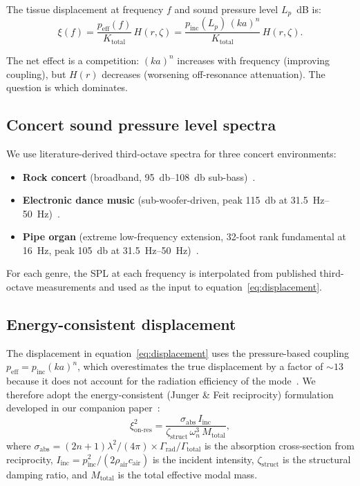 The tissue displacement at frequency $f$ and sound pressure level
$L_p$~dB is:
%
\begin{equation}
  \xi(f) = \frac{p_\mathrm{eff}(f)}{K_\mathrm{total}} \, H(r, \zeta)
  = \frac{p_\mathrm{inc}(L_p)\,(ka)^n}{K_\mathrm{total}} \, H(r, \zeta).
  \label{eq:displacement}
\end{equation}

The net effect is a competition: $(ka)^n$ increases with frequency
(improving coupling), but $H(r)$ decreases (worsening off-resonance
attenuation).  The question is which dominates.

\subsection{Concert sound pressure level spectra}
\label{sec:concert-spl}

We use literature-derived third-octave spectra for three concert
environments:
%
\begin{itemize}
  \item \textbf{Rock concert} (broadband, \SIrange{95}{108}{\decibel}
    sub-bass)~\cite{Gunderson2016}.
  \item \textbf{Electronic dance music} (sub-woofer-driven, peak
    \SI{115}{\decibel} at \SIrange{31.5}{50}{\hertz})~\cite{Opperman2006}.
  \item \textbf{Pipe organ} (extreme low-frequency extension, 32-foot
    rank fundamental at \SI{16}{\hertz}, peak \SI{105}{\decibel} at
    \SIrange{31.5}{50}{\hertz})~\cite{Bickerdike1966}.
\end{itemize}

For each genre, the SPL at each frequency is interpolated from published
third-octave measurements and used as the input to
equation~\eqref{eq:displacement}.

\subsection{Energy-consistent displacement}
\label{sec:energy-consistent}

The displacement in equation~\eqref{eq:displacement} uses the
pressure-based coupling $p_\mathrm{eff} = p_\mathrm{inc}(ka)^n$, which
overestimates the true displacement by a factor of ${\sim}13$ because it
does not account for the radiation efficiency of the
mode~\cite{Junger2012}.  We therefore adopt the energy-consistent
(Junger \& Feit reciprocity) formulation developed in our companion
paper~\cite{Mace2026browntone}:
%
\begin{equation}
  \xi_\mathrm{on\text{-}res}^2 =
    \frac{\sigma_\mathrm{abs}\,I_\mathrm{inc}}
         {\zeta_\mathrm{struct}\,\omega_n^3\,M_\mathrm{total}},
  \label{eq:energy-consistent}
\end{equation}
%
where $\sigma_\mathrm{abs} = (2n+1)\lambda^2/(4\pi) \times
\Gamma_\mathrm{rad}/\Gamma_\mathrm{total}$ is the absorption
cross-section from reciprocity, $I_\mathrm{inc} = p_\mathrm{inc}^2 /
(2\rho_\mathrm{air}c_\mathrm{air})$ is the incident intensity,
$\zeta_\mathrm{struct}$ is the structural damping ratio, and
$M_\mathrm{total}$ is the total effective modal mass.

